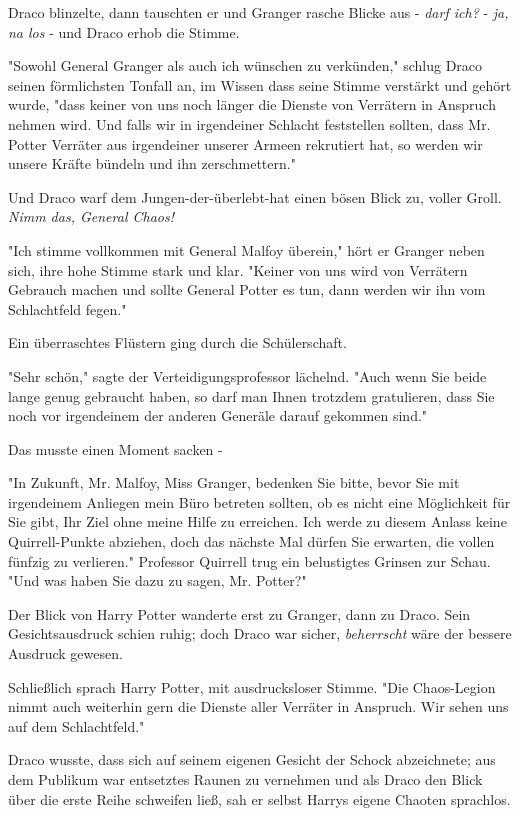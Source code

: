 {Draco blinzelte, dann tauschten er und Granger rasche Blicke aus - \emph{darf ich?} - \emph{ja,} \emph{na los} - und Draco erhob die Stimme.

"Sowohl General Granger als auch ich wünschen zu verkünden," schlug Draco seinen förmlichsten Tonfall an, im Wissen dass seine Stimme verstärkt und gehört wurde, "dass keiner von uns noch länger die Dienste von Verrätern in Anspruch nehmen wird. Und falls wir in irgendeiner Schlacht feststellen sollten, dass Mr. Potter Verräter aus irgendeiner unserer Armeen rekrutiert hat, so werden wir unsere Kräfte bündeln und ihn zerschmettern."

Und Draco warf dem Jungen-der-überlebt-hat einen bösen Blick zu, voller Groll. \emph{Nimm das, General Chaos!}

"Ich stimme vollkommen mit General Malfoy überein," hört er Granger neben sich, ihre hohe Stimme stark und klar. "Keiner von uns wird von Verrätern Gebrauch machen und sollte General Potter es tun, dann werden wir ihn vom Schlachtfeld fegen."

Ein überraschtes Flüstern ging durch die Schülerschaft.

"Sehr schön," sagte der Verteidigungsprofessor lächelnd. "Auch wenn Sie beide lange genug gebraucht haben, so darf man Ihnen trotzdem gratulieren, dass Sie noch vor irgendeinem der anderen Generäle darauf gekommen sind."

Das musste einen Moment sacken -

"In Zukunft, Mr. Malfoy, Miss Granger, bedenken Sie bitte, bevor Sie mit irgendeinem Anliegen mein Büro betreten sollten, ob es nicht eine Möglichkeit für Sie gibt, Ihr Ziel ohne meine Hilfe zu erreichen. Ich werde zu diesem Anlass keine Quirrell-Punkte abziehen, doch das nächste Mal dürfen Sie erwarten, die vollen fünfzig zu verlieren." Professor Quirrell trug ein belustigtes Grinsen zur Schau. "Und was haben Sie dazu zu sagen, Mr. Potter?"

Der Blick von Harry Potter wanderte erst zu Granger, dann zu Draco. Sein Gesichtsausdruck schien ruhig; doch Draco war sicher, \emph{beherrscht} wäre der bessere Ausdruck gewesen.

Schließlich sprach Harry Potter, mit ausdrucksloser Stimme. "Die Chaos-Legion nimmt auch weiterhin gern die Dienste aller Verräter in Anspruch. Wir sehen uns auf dem Schlachtfeld."

Draco wusste, dass sich auf seinem eigenen Gesicht der Schock abzeichnete; aus dem Publikum war entsetztes Raunen zu vernehmen und als Draco den Blick über die erste Reihe schweifen ließ, sah er selbst Harrys eigene Chaoten sprachlos.

}
